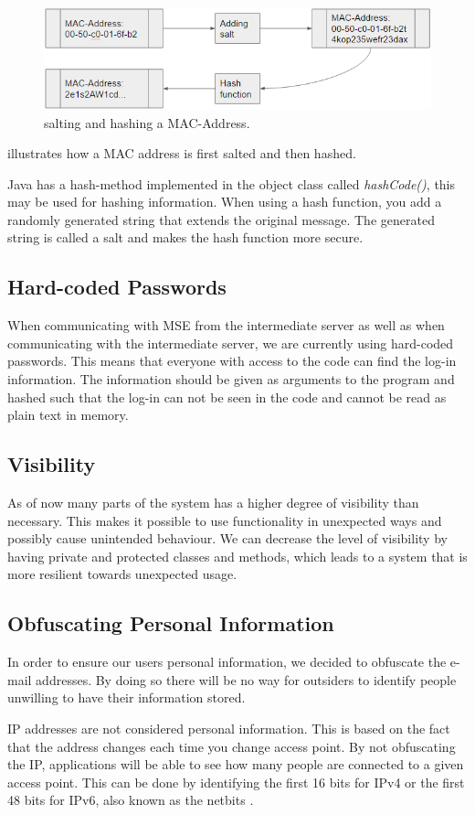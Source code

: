\begin{figure}[ht]
	\begin{center}
		\includegraphics[scale=0.9]{graphics/salt.png}
		\caption{salting and hashing a MAC-Address.}
		\label{fig:salt}
	\end{center} 
\end{figure}

 illustrates how a MAC address is first salted and then hashed.

Java has a hash-method implemented in the object class called \textit{hashCode()}, this may be used for hashing information. When using a hash function, you add a randomly generated string that extends the original message. The generated string is called a salt and makes the hash function more secure.

\subsection*{Hard-coded Passwords}
When communicating with MSE from the intermediate server as well as when communicating with the intermediate server, we are currently using hard-coded passwords. This means that everyone with access to the code can find the log-in information. The information should be given as arguments to the program and hashed such that the log-in can not be seen in the code and cannot be read as plain text in memory. 

\subsection*{Visibility}
As of now many parts of the system has a higher degree of visibility than necessary. This makes it possible to use functionality in unexpected ways and possibly cause unintended behaviour. We can decrease the level of visibility by having private and protected classes and methods, which leads to a system that is more resilient towards unexpected usage.
 
\subsection*{Obfuscating Personal Information}
In order to ensure our users personal information, we decided to obfuscate the e-mail addresses. By doing so there will be no way for outsiders to identify people unwilling to have their information stored.

IP addresses are not considered personal information. This is based on the fact that the address changes each time you change access point. By not obfuscating the IP, applications will be able to see how many people are connected to a given access point. This can be done by identifying the first 16 bits for IPv4 or the first 48 bits for IPv6, also known as the netbits \cite{IPnetworkID}.